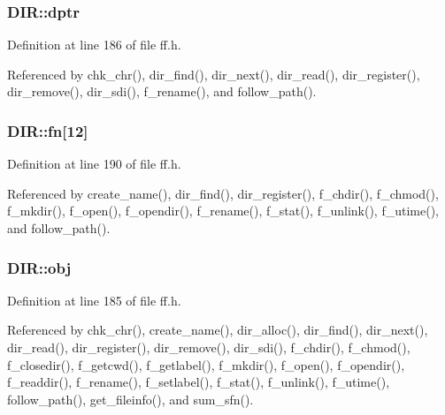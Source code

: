 \subsubsection[{\texorpdfstring{dptr}{dptr}}]{ D\+I\+R\+::dptr}\hypertarget{structDIR_a0330e9554e1f38795debe4495156873e}{}\label{structDIR_a0330e9554e1f38795debe4495156873e}


Definition at line 186 of file ff.\+h.



Referenced by chk\+\_\+chr(), dir\+\_\+find(), dir\+\_\+next(), dir\+\_\+read(), dir\+\_\+register(), dir\+\_\+remove(), dir\+\_\+sdi(), f\+\_\+rename(), and follow\+\_\+path().

\subsubsection[{\texorpdfstring{fn}{fn}}]{ D\+I\+R\+::fn\mbox{[}12\mbox{]}}\hypertarget{structDIR_ad90d974c0e7640307598c586bf141b32}{}\label{structDIR_ad90d974c0e7640307598c586bf141b32}


Definition at line 190 of file ff.\+h.



Referenced by create\+\_\+name(), dir\+\_\+find(), dir\+\_\+register(), f\+\_\+chdir(), f\+\_\+chmod(), f\+\_\+mkdir(), f\+\_\+open(), f\+\_\+opendir(), f\+\_\+rename(), f\+\_\+stat(), f\+\_\+unlink(), f\+\_\+utime(), and follow\+\_\+path().

\subsubsection[{\texorpdfstring{obj}{obj}}]{ D\+I\+R\+::obj}\hypertarget{structDIR_a5a4848c51616bf4ad90518c211ca3bb3}{}\label{structDIR_a5a4848c51616bf4ad90518c211ca3bb3}


Definition at line 185 of file ff.\+h.



Referenced by chk\+\_\+chr(), create\+\_\+name(), dir\+\_\+alloc(), dir\+\_\+find(), dir\+\_\+next(), dir\+\_\+read(), dir\+\_\+register(), dir\+\_\+remove(), dir\+\_\+sdi(), f\+\_\+chdir(), f\+\_\+chmod(), f\+\_\+closedir(), f\+\_\+getcwd(), f\+\_\+getlabel(), f\+\_\+mkdir(), f\+\_\+open(), f\+\_\+opendir(), f\+\_\+readdir(), f\+\_\+rename(), f\+\_\+setlabel(), f\+\_\+stat(), f\+\_\+unlink(), f\+\_\+utime(), follow\+\_\+path(), get\+\_\+fileinfo(), and sum\+\_\+sfn().

